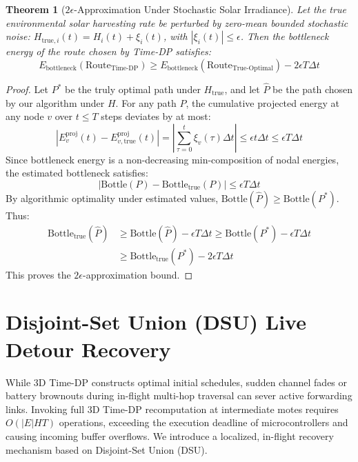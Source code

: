 \documentclass[journal]{IEEEtran}
\newtheorem{theorem}{Theorem}
\begin{document}
\begin{theorem}[$2\epsilon$-Approximation Under Stochastic Solar Irradiance]
Let the true environmental solar harvesting rate be perturbed by zero-mean bounded stochastic noise: $H_{\text{true}, i}(t) = H_i(t) + \xi_i(t)$, with $|\xi_i(t)| \le \epsilon$. Then the bottleneck energy of the route chosen by Time-DP satisfies:
\begin{equation}
E_{\text{bottleneck}}(\text{Route}_{\text{Time-DP}}) \ge E_{\text{bottleneck}}(\text{Route}_{\text{True-Optimal}}) - 2 \epsilon T \Delta t
\end{equation}
\end{theorem}
\begin{proof}
Let $P^*$ be the truly optimal path under $H_{\text{true}}$, and let $\hat{P}$ be the path chosen by our algorithm under $H$. For any path $P$, the cumulative projected energy at any node $v$ over $t \le T$ steps deviates by at most:
\begin{equation}
\left| E_v^{\text{proj}}(t) - E_{v, \text{true}}^{\text{proj}}(t) \right| = \left| \sum_{\tau=0}^t \xi_v(\tau) \Delta t \right| \le \epsilon t \Delta t \le \epsilon T \Delta t
\end{equation}
Since bottleneck energy is a non-decreasing min-composition of nodal energies, the estimated bottleneck satisfies:
\begin{equation}
\left| \text{Bottle}(P) - \text{Bottle}_{\text{true}}(P) \right| \le \epsilon T \Delta t
\end{equation}
By algorithmic optimality under estimated values, $\text{Bottle}(\hat{P}) \ge \text{Bottle}(P^*)$. Thus:
\begin{align}
\text{Bottle}_{\text{true}}(\hat{P}) &\ge \text{Bottle}(\hat{P}) - \epsilon T \Delta t \ge \text{Bottle}(P^*) - \epsilon T \Delta t \nonumber \\
&\ge \text{Bottle}_{\text{true}}(P^*) - 2 \epsilon T \Delta t
\end{align}
This proves the $2\epsilon$-approximation bound.
\end{proof}

\section{Disjoint-Set Union (DSU) Live Detour Recovery}
While 3D Time-DP constructs optimal initial schedules, sudden channel fades or battery brownouts during in-flight multi-hop traversal can sever active forwarding links. Invoking full 3D Time-DP recomputation at intermediate motes requires $O(|E|HT)$ operations, exceeding the execution deadline of microcontrollers and causing incoming buffer overflows. We introduce a localized, in-flight recovery mechanism based on Disjoint-Set Union (DSU).
\end{document}

